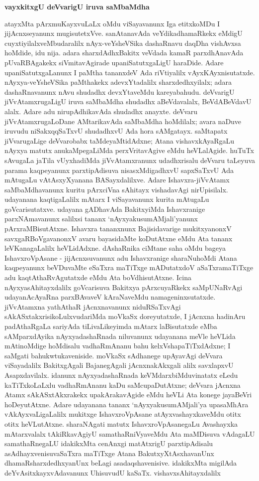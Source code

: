 \smallskip
\begin{center}
{\Large\bf vayxkitxgU deVvarigU iruva saMbaMdha}
\end{center}

atayxMta pArxmuKayxvuLaLx oMdu viSayavanunx Iga etitxkoMDu I jijAcnxseyanunx mugisutetxVve. sanAtanavAda veYdikadhamaRkekx eMdigU cuyxtiyilalxveMbudaralilx nAyx-veYsheVSika dashaRnavu daqDha vishAvxsa hoMdide, idu nija. adara sharxdAdhxBakitx veVdada kamaR parxdhAnavAda pUvaRBAgakekx siVmitavAgirade upaniSatutxgaLigU haraDide. Adare upaniSatutxgaLanunx I paMtha tananxdeV Ada riVtiyalilx vAyxKAyxnisutatxde. nAyxya-veYsheVSika paMthakekx adevxYtadalilx sharxdedhxyilalx; adara dashaRnavanunx nAvu shudadhx devxYtaveMdu kareyabahudu. deVvarigU jiVvAtamxrugaLigU iruva saMbaMdha shudadhx aBeVdavalalx, BeVdABeVdavU alalx. Adare adu nirupAdhikavAda shudadhx anayxte. deVvaru jiVvAtamxrugaLoDane AMtarikavAda saMbaMdha hoMdilalx; avara naDuve iruvudu niSakxqqSaTxvU shudadhxvU Ada hora sAMgatayx. saMtapatx jiVvarugaLige deVvarobabx taMdeyaMtidAdxne; Atana vishavxkAyaRgaLu nAyxya matutx anukaMpegaLiMda perxVritavAgive eMdu heVLalAgide. huTuTx sAvugaLa jaTila vUyxhadiMda jiVvAtamxranunx udadhxrisalu deVvaru taLeyuva parama kaqpeyanunx parxtipAdisuva nisasxMdigadhxvU sapxSaTxvU Ada mAtugaLu vAtAsxyXyanana BASayxdalilxve. Adare Ishavxra-jiVvAtamx saMbaMdhavanunx kuritu pArxciVna sAhitayx vishadavAgi nirUpisilalx. udayanana kaqtigaLalilx mAtarx I viSayavanunx kurita mAtugaLu goVcarisutatxve. udayana gADhavAda BakitxyiMda Ishavxranige parxNAmavanunx salilxsi tananx `nAyxyakusumAMjali'yanunx pArxraMBisutAtxne. Ishavxra tananxnunx Bajisidavarige mukitxyanonxV savxgaRBoVgavanonxV avaru bayasidaMte koDutAtxne eMdu Ata tananx leVKanagaLalilx heVLidAdxne. dAshaRnika ciMtane saha oMdu bageya IshavxroVpAsane - jijAcnxsuvanunx adu Ishavxranige sharaNuhoMdi Atana kaqpeyanunx beVDuvaMte eSaTxra maTiTxge mADutatxdoV aSaTxramaTiTxge adu kaqtAthaRvAgutatxde eMdu Ata boVdhisutAtxne. Icina nAyxyasAhitayxdalilx goVcarisuva Bakitxya pArxcuyaRkekx saMpUNaRvAgi udayanAcAyaRna parxBAvaveV kAraNaveMdu namageninxsutatxde. jiVvAtamxna yathAthaR jAcnxnavanunx niduRSaTxvAgi sAkASxtakxrisikoLulxvudariMda moVkaSx doreyutatxde, I jAcnxna hadinAru padAthaRgaLa sariyAda tiLivaLikeyimda mAtarx laBisutatxde eMba sAMparxdAyika nAyxyadashaRnada niluvanunx udayanana meVle heVLida mAtinoMdige hoMdisalu vadhaRmAnanu bahu kelxVshapaTiTxdAdxne; I saMgati bahukwtukaveniside. moVkaSx sAdhanege upAyavAgi deVvara viSayadalilx BakitxgAgali BajanegAgali jAcnxnakAkxgali alilx savxlapxvU Asapxdavilalx. idanunx nAyxyadashaRnada keVMdarxbiMduvinatatx eLedu kaTiTxkoLaLxlu vadhaRmAnanu kaDu saMcupaDutAtxne; deVvara jAcnxna Atamx sAkASxtAkxrakekx upakArakavAgide eMdu heVLi Ata konege jayaBeVri hoDeyutAtxne. Adare udayanana tananx `nAyxyakusumAMjali'ya upasaMhAra vAkAyxvaLigaLalilx mukitxge IshavxroVpAsane atAyxvashayxkaveMdu otitx otitx heVLutAtxne. sharaNAgati matutx IshavxroVpAsanegaLu Avashayxka mAtarxvalalx tAkiRkavAgiyU samathaRniVyaveMdu Ata maMDisuva vAdagaLU samathaRnegaLU idakikxMta cenAnxgi matAtxrigU parxtipAdisalu asAdhayxvenisuvaSaTxra maTiTxge Atana BakutxyXtAsxhavanUnx dhamaRsharxdedhxyanUnx beLagi asadaqshavenisive. idakikxMta migilAda deYvAsitxkayxvAdavanunx UhisuvudU kaSaTx. vishavxsAhitayxdalilx 